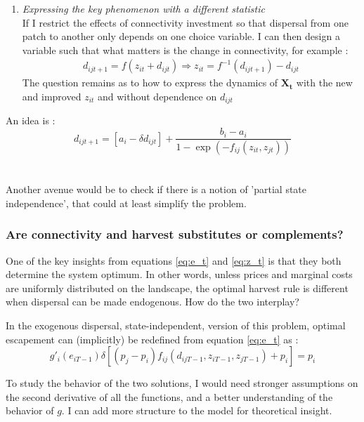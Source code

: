 \documentclass{article}
\begin{document}
\begin{enumerate}
\begin{itemize}
    \end{itemize}
    \item \textit{Expressing the key phenomenon with a different statistic}\\
    If I restrict the effects of connectivity investment so that dispersal from one patch to another only depends on one choice variable. I can then design a variable such that what matters is the change in connectivity, for example :
    \begin{align*}
        d_{ijt+1} = f( z_{it}+d_{ijt}) \Rightarrow z_{it} = f^{-1}(d_{ijt+1})-d_{ijt}
    \end{align*}
    The question remains as to how to express the dynamics of $\mathbf{X_t}$ with the new and improved $z_{it}$ and without dependence on $d_{ijt}$
\end{enumerate}
An idea is : 
\begin{equation}
    d_{ijt+1} = [a_i - \delta d_{ijt}] + \frac{b_i - a_i}{1-\exp(-f_{ij}(z_{it},z_{jt}))}
\end{equation}
\\\\
Another avenue would be to check if there is a notion of 'partial state independence', that could at least simplify the problem. 



\subsubsection{Are connectivity and harvest substitutes or complements? }
One of the key insights from equations \ref{eq:e_t} and \ref{eq:z_t} is that they both determine the system optimum. In other words, unless prices and marginal costs are uniformly distributed on the landscape, the optimal harvest rule is different when dispersal can be made endogenous. How do the two interplay? 

In the exogenous dispersal, state-independent, version of this problem, optimal escapement can (implicitly) be redefined from equation \ref{eq:e_t} as : 
$$
g'_i(e_{iT-1}) \delta[(p_j - p_i)f_{ij}(d_{ijT-1}, z_{iT-1}, z_{jT-1}) + p_i] = p_i
$$

To study the behavior of the two solutions, I would need stronger assumptions on the second derivative of all the functions, and a better understanding of the behavior of $g$. I can add more structure to the model for theoretical insight. 
\end{document}
